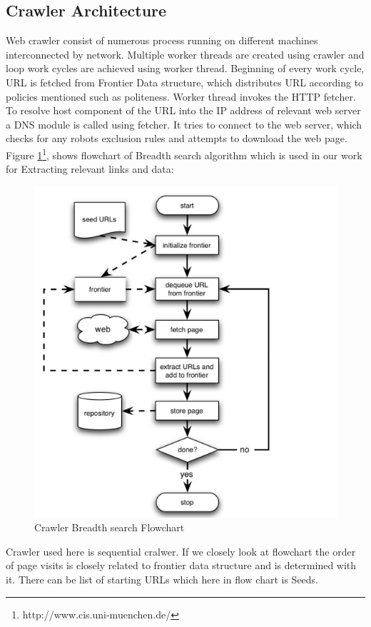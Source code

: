\documentclass[article,type=msc,colorback,accentcolor=tud9c,twoside,11pt]{tudthesis}
\begin{document}
\subsection{Crawler Architecture}

Web crawler consist of numerous process running on different machines interconnected by network. Multiple worker threads are created using crawler and loop work cycles are achieved using worker thread. Beginning of every work cycle, URL is fetched from Frontier Data structure,  which distributes URL according to policies mentioned such as politeness. Worker thread invokes the HTTP fetcher. To resolve host component of the URL into the IP address of relevant web server a DNS module is called using fetcher. It tries to connect to the web server, which checks for any robots exclusion rules and attempts to download the web page.
Figure \ref{fig:CrawlerAlgorithFlowchart}\footnote{http://www.cis.uni-muenchen.de/}, shows flowchart of Breadth search algorithm which is used in our work for Extracting relevant links and data:
\begin{figure}[h]
	\centering
	\includegraphics[scale=0.9]{CrawlerAlgorithFlowchart}
	\caption{Crawler Breadth search Flowchart}
	\label{fig:CrawlerAlgorithFlowchart}
\end{figure}
Crawler used here is sequential cralwer. If we closely look at flowchart the order of page visits is closely related to frontier data structure and is determined with it. There can be list of starting URLs which here in flow chart is Seeds.
	
\end{document}
